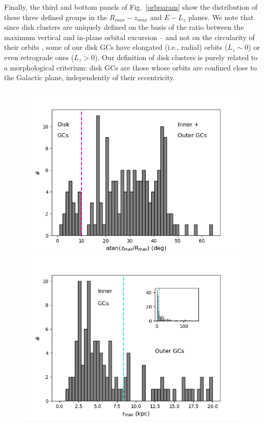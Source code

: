         Finally, the third and bottom panels of Fig.~\ref{orbparam}  show the distribution of these three defined groups in the $R_{max}-z_{max}$ and $E-L_z$ planes. We note that since disk clusters are uniquely defined on the basis of the ratio between the maximum vertical and in-plane orbital excursion -- and not on the circularity of their orbits \citep[as seen, e.g., in][]{2019A&A...630L...4M},  some of our disk GCs have elongated (i.e., radial) orbits ($L_z  \sim 0$) or even retrograde ones ($L_z > 0$). Our definition of disk clusters is purely related to a morphological criterium: disk GCs are those whose orbits are confined close to the Galactic plane, independently of their eccentricity.

        \begin{figure}
            \begin{center}
                \includegraphics[clip=true, trim = 0mm 0mm 0mm 0mm, width=0.7\columnwidth]{images/PII_orbitparams_atanRzmax.png}
                \includegraphics[clip=true, trim = 0mm 0mm 0mm 0mm, width=0.7\columnwidth]{images/PII_orbitparams_rmax_notD.png}


\end{center}
\end{figure}

